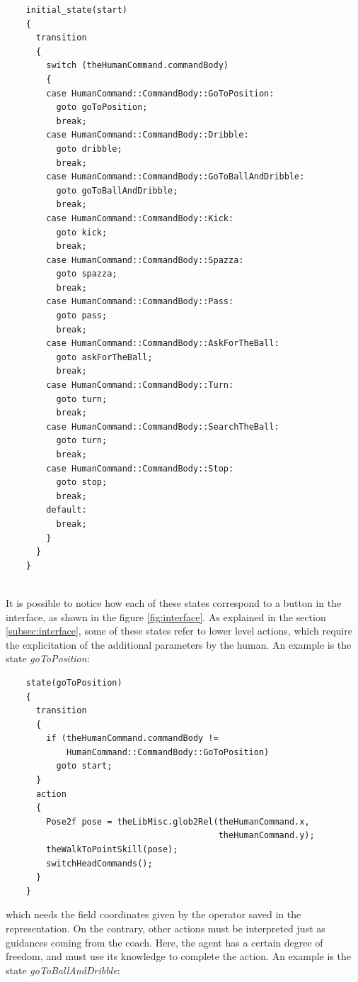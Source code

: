 \documentclass[a4paper, onecolumn, 12pt]{article}
\begin{document}
\begin{verbatim}
    initial_state(start)
    {
      transition
      {
        switch (theHumanCommand.commandBody)
        { 
        case HumanCommand::CommandBody::GoToPosition:
          goto goToPosition;
          break;
        case HumanCommand::CommandBody::Dribble:
          goto dribble;
          break;
        case HumanCommand::CommandBody::GoToBallAndDribble:
          goto goToBallAndDribble;
          break;
        case HumanCommand::CommandBody::Kick:
          goto kick;
          break;
        case HumanCommand::CommandBody::Spazza:
          goto spazza;
          break;
        case HumanCommand::CommandBody::Pass:
          goto pass;
          break;
        case HumanCommand::CommandBody::AskForTheBall:
          goto askForTheBall;
          break;
        case HumanCommand::CommandBody::Turn:
          goto turn;
          break;
        case HumanCommand::CommandBody::SearchTheBall:
          goto turn;
          break;
        case HumanCommand::CommandBody::Stop:
          goto stop;
          break;
        default:
          break;
        }
      }
    }
   
\end{verbatim}

It is possible to notice how each of these states correspond to a button in the interface,
as shown in the figure \ref{fig:interface}.
As explained in the section \ref{subsec:interface}, some of these states refer to lower 
level actions, which require the explicitation of the additional parameters by the human.
An example is the state \textit{goToPosition}:

\begin{verbatim}
    state(goToPosition)
    {
      transition
      {
        if (theHumanCommand.commandBody != 
            HumanCommand::CommandBody::GoToPosition)
          goto start;
      }
      action
      {
        Pose2f pose = theLibMisc.glob2Rel(theHumanCommand.x, 
                                          theHumanCommand.y);
        theWalkToPointSkill(pose);
        switchHeadCommands();
      }
    }

\end{verbatim}

which needs the field coordinates given by the operator saved in the representation.
On the contrary, other actions must be interpreted just as guidances coming 
from the coach. Here, the agent has a certain degree of freedom, and must use 
its knowledge to complete the action. An example is the state \textit{goToBallAndDribble}:
\end{document}
